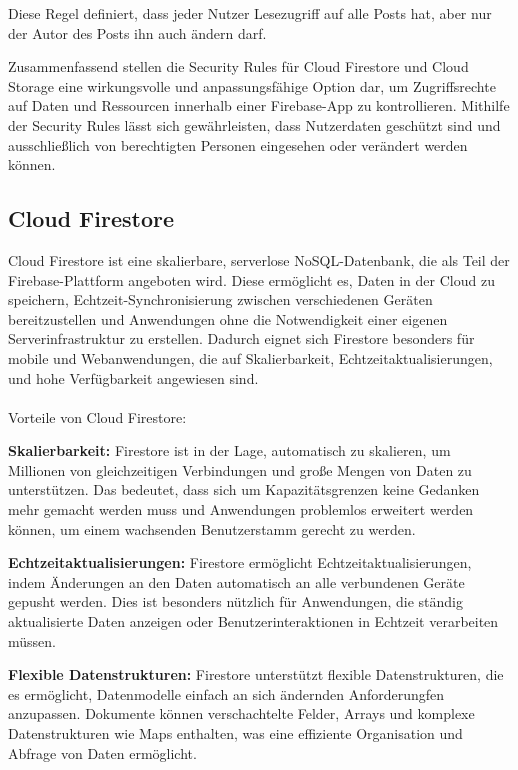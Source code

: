 Diese Regel definiert, dass jeder Nutzer Lesezugriff auf
alle Posts hat, aber nur der Autor des Posts ihn auch ändern
darf.

Zusammenfassend stellen die Security Rules für Cloud Firestore und Cloud Storage eine wirkungsvolle und anpassungsfähige Option dar, um Zugriffsrechte auf Daten und Ressourcen innerhalb einer Firebase-App zu kontrollieren. Mithilfe der Security Rules lässt sich gewährleisten, dass Nutzerdaten geschützt sind und ausschließlich von berechtigten Personen eingesehen oder verändert werden können.



\subsection{Cloud Firestore}
\author{Sandin Habibovic}

Cloud Firestore\cite{firestore} ist eine skalierbare, serverlose NoSQL-Datenbank, die als Teil der Firebase-Plattform angeboten wird. Diese ermöglicht es, Daten in der Cloud zu speichern, Echtzeit-Synchronisierung zwischen verschiedenen Geräten bereitzustellen und Anwendungen ohne die Notwendigkeit einer eigenen Serverinfrastruktur zu erstellen. Dadurch eignet sich Firestore besonders für mobile und Webanwendungen, die auf Skalierbarkeit, Echtzeitaktualisierungen, und hohe Verfügbarkeit angewiesen sind.
\\\\
Vorteile von Cloud Firestore:

\textbf{Skalierbarkeit:} Firestore ist in der Lage, automatisch zu skalieren, um Millionen von gleichzeitigen Verbindungen und große Mengen von Daten zu unterstützen. Das bedeutet, dass sich um Kapazitätsgrenzen keine Gedanken mehr gemacht werden muss und Anwendungen problemlos erweitert werden können, um einem wachsenden Benutzerstamm gerecht zu werden.

\textbf{Echtzeitaktualisierungen:} Firestore ermöglicht
Echtzeitaktualisierungen, indem Änderungen an den Daten
automatisch an alle verbundenen Geräte gepusht werden. Dies
ist besonders nützlich für Anwendungen, die ständig
aktualisierte Daten anzeigen oder Benutzerinteraktionen in
Echtzeit verarbeiten müssen.


\textbf{Flexible Datenstrukturen:} Firestore unterstützt flexible Datenstrukturen, die es ermöglicht, Datenmodelle einfach an sich ändernden Anforderungfen anzupassen. Dokumente können verschachtelte Felder, Arrays und komplexe Datenstrukturen wie Maps enthalten, was eine effiziente Organisation und Abfrage von Daten ermöglicht.

